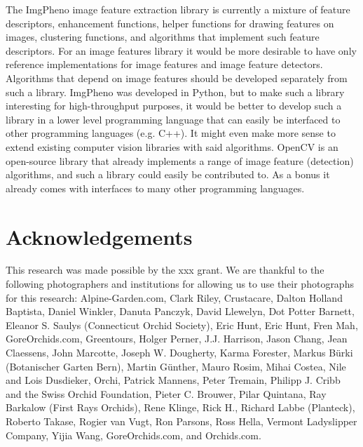 \documentclass[3p,twocolumn,10pt]{elsarticle}
\begin{document}
The ImgPheno image feature extraction library is currently a mixture of feature descriptors, enhancement functions, helper functions for drawing features on images, clustering functions, and algorithms that implement such feature descriptors. For an image features library it would be more desirable to have only reference implementations for image features and image feature detectors. Algorithms that depend on image features should be developed separately from such a library. ImgPheno was developed in Python, but to make such a library interesting for high-throughput purposes, it would be better to develop such a library in a lower level programming language that can easily be interfaced to other programming languages (e.g. C++). It might even make more sense to extend existing computer vision libraries with said algorithms. OpenCV is an open-source library that already implements a range of image feature (detection) algorithms, and such a library could easily be contributed to. As a bonus it already comes with interfaces to many other programming languages.


\section*{Acknowledgements}
\label{sec:acknowledgements}


This research was made possible by the xxx grant. We are thankful to the following photographers and institutions for allowing us to use their photographs for this research: Alpine-Garden.com, Clark Riley, Crustacare, Dalton Holland Baptista, Daniel Winkler, Danuta Panczyk, David Llewelyn, Dot Potter Barnett, Eleanor S. Saulys (Connecticut Orchid Society), Eric Hunt, Eric Hunt, Fren Mah, GoreOrchids.com, Greentours, Holger Perner, J.J. Harrison, Jason Chang, Jean Claessens, John Marcotte, Joseph W. Dougherty, Karma Forester, Markus Bürki (Botanischer Garten Bern), Martin Günther, Mauro Rosim, Mihai Costea, Nile and Lois Dusdieker, Orchi, Patrick Mannens, Peter Tremain, Philipp J. Cribb and the Swiss Orchid Foundation, Pieter C. Brouwer, Pilar Quintana, Ray Barkalow (First Rays Orchids), Rene Klinge, Rick H., Richard Labbe (Planteck), Roberto Takase, Rogier van Vugt, Ron Parsons, Ross Hella, Vermont Ladyslipper Company, Yijia Wang, GoreOrchids.com, and Orchids.com.
\end{document}
